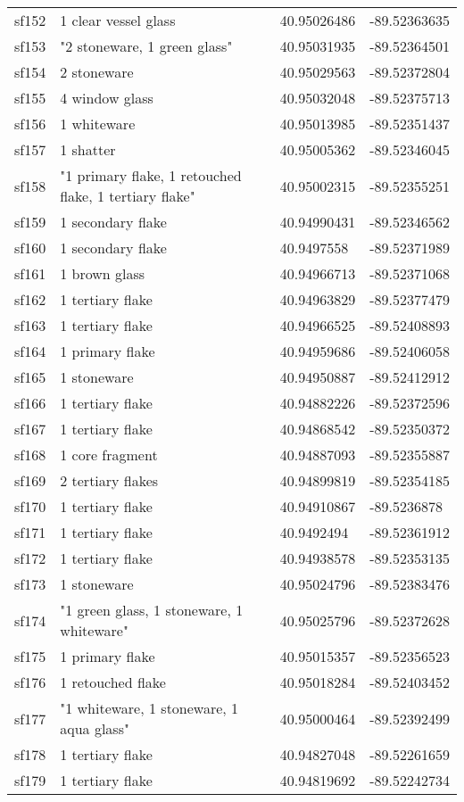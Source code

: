 \begin{longtable}{p{1cm}p{6cm}ll}
	sf152 & 1 clear vessel glass & 40.95026486 & -89.52363635\\
	sf153 & "2 stoneware, 1 green glass" & 40.95031935 & -89.52364501\\
	sf154 & 2 stoneware & 40.95029563 & -89.52372804\\
	sf155 & 4 window glass & 40.95032048 & -89.52375713\\
	sf156 & 1 whiteware & 40.95013985 & -89.52351437\\
	sf157 & 1 shatter & 40.95005362 & -89.52346045\\
	sf158 & "1 primary flake, 1 retouched flake, 1 tertiary flake" & 40.95002315 & -89.52355251\\
	sf159 & 1 secondary flake & 40.94990431 & -89.52346562\\
	sf160 & 1 secondary flake & 40.9497558 & -89.52371989\\
	sf161 & 1 brown glass & 40.94966713 & -89.52371068\\
	sf162 & 1 tertiary flake & 40.94963829 & -89.52377479\\
	sf163 & 1 tertiary flake & 40.94966525 & -89.52408893\\
	sf164 & 1 primary flake & 40.94959686 & -89.52406058\\
	sf165 & 1 stoneware & 40.94950887 & -89.52412912\\
	sf166 & 1 tertiary flake & 40.94882226 & -89.52372596\\
	sf167 & 1 tertiary flake & 40.94868542 & -89.52350372\\
	sf168 & 1 core fragment & 40.94887093 & -89.52355887\\
	sf169 & 2 tertiary flakes & 40.94899819 & -89.52354185\\
	sf170 & 1 tertiary flake & 40.94910867 & -89.5236878\\
	sf171 & 1 tertiary flake & 40.9492494 & -89.52361912\\
	sf172 & 1 tertiary flake & 40.94938578 & -89.52353135\\
	sf173 & 1 stoneware & 40.95024796 & -89.52383476\\
	sf174 & "1 green glass, 1 stoneware, 1 whiteware" & 40.95025796 & -89.52372628\\
	sf175 & 1 primary flake & 40.95015357 & -89.52356523\\
	sf176 & 1 retouched flake & 40.95018284 & -89.52403452\\
	sf177 & "1 whiteware, 1 stoneware, 1 aqua glass" & 40.95000464 & -89.52392499\\
	sf178 & 1 tertiary flake & 40.94827048 & -89.52261659\\
	sf179 & 1 tertiary flake & 40.94819692 & -89.52242734\\


\end{longtable}
